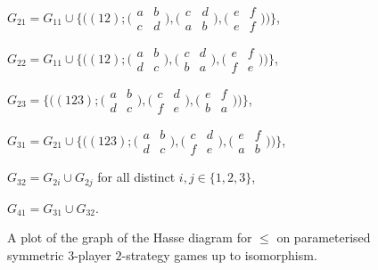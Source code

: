 \begin{figure}
\begin{center}
		$G_{21} = G_{11} \cup \{\bigl((12) ; \bigl(\begin{smallmatrix} a & b \\ c & d \end{smallmatrix}\bigr), \bigl(\begin{smallmatrix} c & d \\ a & b \end{smallmatrix}\bigr), \bigl(\begin{smallmatrix} e & f \\ e & f \end{smallmatrix}\bigr)\bigr)\}$,
		
		$G_{22} = G_{11} \cup \{\bigl((12) ; \bigl(\begin{smallmatrix} a & b \\ d & c \end{smallmatrix}\bigr), \bigl(\begin{smallmatrix} c & d \\ b & a \end{smallmatrix}\bigr), \bigl(\begin{smallmatrix} e & f \\ f & e \end{smallmatrix}\bigr)\bigr)\}$,
		
		$G_{23} = \{\bigl((123) ; \bigl(\begin{smallmatrix} a & b \\ d & c \end{smallmatrix}\bigr), \bigl(\begin{smallmatrix} c & d \\ f & e \end{smallmatrix}\bigr), \bigl(\begin{smallmatrix} e & f \\ b & a \end{smallmatrix}\bigr)\bigr)\}$,
		
		$G_{31} = G_{21} \cup \{\bigl((123) ; \bigl(\begin{smallmatrix} a & b \\ d & c \end{smallmatrix}\bigr), \bigl(\begin{smallmatrix} c & d \\ f & e \end{smallmatrix}\bigr), \bigl(\begin{smallmatrix} e & f \\ a & b \end{smallmatrix}\bigr)\bigr)\}$,
		
		$G_{32} = G_{2i} \cup G_{2j}$ for all distinct $i, j \in \{1,2,3\}$,
		
		$G_{41} = G_{31} \cup G_{32}$.
		\end{center}
		
		\vspace{-0.5cm}
		\caption{A plot of the graph of the Hasse diagram for $\leq$ on parameterised symmetric $3$-player $2$-strategy games up to isomorphism.}
		\label{3pHasse}
	\end{figure}
	

